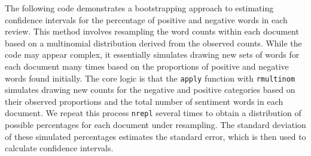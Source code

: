 \documentclass[
]{book}
\begin{document}
The following code demonstrates a bootstrapping approach to estimating confidence intervals for the percentage of positive and negative words in each review. This method involves resampling the word counts within each document based on a multinomial distribution derived from the observed counts. While the code may appear complex, it essentially simulates drawing new sets of words for each document many times based on the proportions of positive and negative words found initially. The core logic is that the \texttt{apply} function with \texttt{rmultinom} simulates drawing new counts for the negative and positive categories based on their observed proportions and the total number of sentiment words in each document. We repeat this process \texttt{nrepl} several times to obtain a distribution of possible percentages for each document under resampling. The standard deviation of these simulated percentages estimates the standard error, which is then used to calculate confidence intervals.
\end{document}
